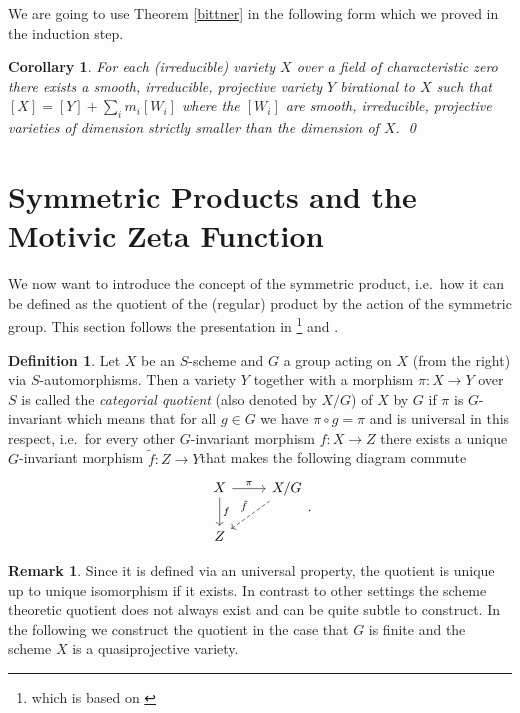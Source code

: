 \documentclass[11pt, a4paper, german, twoside]{article}
\theoremstyle{plain}
\newtheorem{corollary}[theorem]{Corollary}
\theoremstyle{definition}
\newtheorem{definition}[theorem]{Definition}
\newtheorem{remark}[theorem]{Remark}
\begin{document}
We are going to use Theorem \ref{bittner} in the following form which we proved in the induction step.

\begin{corollary}
    \label{decomp}
    For each (irreducible) variety $X$ over a field of characteristic zero there exists a smooth, irreducible, projective variety $Y$ birational
    to $X$ such that $[X] = [Y] + \sum_i m_i[W_i]$ where the $[W_i]$ are smooth, irreducible, projective varieties of dimension strictly
    smaller than the dimension of $X$. \qed
\end{corollary}




\section{Symmetric Products and the Motivic Zeta Function}
\label{symProd}
We now want to introduce the concept of the symmetric product, i.e.\ how it can be defined as the quotient of the (regular) product by the
action of the symmetric group. This section follows the presentation in \cite[Appendix A]{mustata}\footnote{which is based on \cite[§7]{MumAV}}
and \cite[Lecture 10]{harris}.
\begin{definition}
    Let $X$ be an $S$-scheme and $G$ a group acting on $X$ (from the right) 
    via $S$-automorphisms. Then a variety $Y$ together with a morphism $\pi \colon X \to Y$
    over $S$ is called the 
    \emph{categorial quotient} (also denoted by $X/G$) of $X$ by $G$ if $\pi$ is $G$-invariant which means that for all $g \in G$ we have
    $\pi \circ g = \pi$ and is universal in this respect, i.e.\ for every other $G$-invariant morphism $f \colon X \to Z$ there exists a unique
    $G$-invariant morphism $\tilde{f} \colon Z \to Y$that makes the following diagram commute
    \begin{equation*}
        \begin{tikzcd}
            X \arrow{r}{\pi} \arrow{d}{f} & X/G \\
            Z \arrow[dashleftarrow]{ur}{\tilde{f}}
        \end{tikzcd}.
    \end{equation*}
\end{definition}

\begin{remark}
    Since it is defined via an universal property, the quotient is unique up to unique isomorphism if it exists. 
    In contrast to other settings the scheme theoretic quotient does not always exist and can be quite subtle to construct.
    In the following we construct the quotient in the case that $G$ is finite and the scheme $X$ is a quasiprojective variety.
\end{remark}
\end{document}
